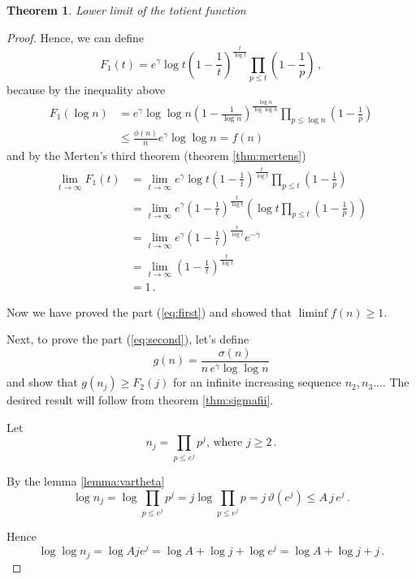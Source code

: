 \documentclass{article}
\theoremstyle{definition}
\newtheorem{theorem}[subsubsection]{Theorem}
\begin{document}
\begin{theorem}{\emph{Lower limit of the totient function}}
\begin{proof}
Hence, we can define
\begin{equation*}
    F_1(t)=e^\gamma \log t \left(1-\frac{1}{t}\right)^\frac{t}{\log t} \prod_{p\leq t} \left(1-\frac{1}{p}\right)\,,
\end{equation*}
because by the inequality above
\begin{align*}
    F_1(\log n) & = e^\gamma \log \log n \left(1-\frac{1}{\log n}\right)^\frac{\log n}{\log \log n} \prod_{p\leq \log n} \left(1-\frac{1}{p}\right)\\
    & \leq \frac{\phi(n)}{n} e^\gamma \log\log n = f(n)
\end{align*}
and by the Merten's third theorem (theorem \ref{thm:mertens})
\begin{align*}
    \lim_{t \rightarrow \infty} F_1(t) & = \lim_{t \rightarrow \infty} e^\gamma \log t \left(1-\frac{1}{t}\right)^\frac{t}{\log t} \prod_{p\leq t} \left(1-\frac{1}{p}\right)\\
    & = \lim_{t \rightarrow \infty} e^\gamma \left( 1-\frac{1}{t}\right)^\frac{t}{\log t} \left(\log t \prod_{p\leq t} \left(1-\frac{1}{p}\right) \right)\\
    & = \lim_{t \rightarrow \infty} e^\gamma \left( 1-\frac{1}{t}\right)^\frac{t}{\log t} e^{-\gamma}\\
    & = \lim_{t \rightarrow \infty} \left( 1-\frac{1}{t}\right)^\frac{t}{\log t}\\
    & = 1\,.
\end{align*}

Now we have proved the part (\ref{eq:first}) and showed that
$\liminf{f(n)}\geq 1$.

Next, to prove the part (\ref{eq:second}), let's define
\begin{equation*}
    g(n)=\frac{\sigma(n)}{n\,e^\gamma \log\log n}
\end{equation*}
and show that $g(n_j) \geq F_2(j)$ for an infinite increasing sequence $n_2,n_3\dots$. The desired result will follow from theorem \ref{thm:sigmafii}.

Let
\begin{equation*}
    n_j=\prod_{p\leq e^j} p^j\text{, where } j\geq 2\,.
\end{equation*}

By the lemma \ref{lemma:vartheta}
\begin{equation*}
    \log n_j = \log \prod_{p\leq e^j} p^j = j \log \prod_{p\leq e^j} p = j\,\vartheta(e^j) \leq A\,j\,e^j\,.
\end{equation*}

Hence
\begin{equation*}
\label{eq:lognj}
    \log \log n_j = \log Aje^j = \log A + \log j + \log e^j = \log A + \log j + j\,.
\end{equation*}


\end{proof}
\end{theorem}
\end{document}
